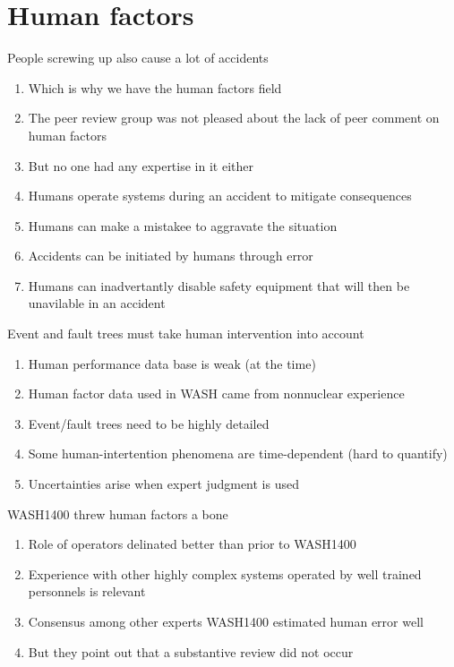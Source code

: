 \documentclass[aspectratio=1610,pdftex,dvipsnames,compress,xcolor={dvipsnames}]{beamer}
\begin{document}
\section{Human factors}


\addtocounter{framenumber}{-1}
\begin{frame}{People screwing up also cause a lot of accidents}
    \begin{enumerate}[series=outerlist,topsep=0pt,itemsep=7pt,leftmargin=*,label=(\arabic*)]
        \item[]Which is why we have the human factors field
        \item[]The peer review group was not pleased about the lack of peer comment on human factors
        \item[]But no one had any expertise in it either 
            \vspace{0.10in}
        \item Humans operate systems during an accident to mitigate consequences
        \item Humans can make a mistakee to aggravate the situation
        \item Accidents can be initiated by humans through error
        \item Humans can inadvertantly disable safety equipment that will then be unavilable in an accident
    \end{enumerate}
\end{frame}


\begin{frame}{Event and fault trees must take human intervention into account}
    \begin{enumerate}[series=outerlist,topsep=0pt,itemsep=21pt,leftmargin=*,label=(\arabic*)]
        \item Human performance data base is weak (at the time)
        \item Human factor data used in WASH came from nonnuclear experience
        \item Event/fault trees need to be highly detailed
        \item Some human-intertention phenomena are time-dependent (hard to quantify)
        \item Uncertainties arise when expert judgment is used 
    \end{enumerate}
\end{frame}


\begin{frame}{WASH1400 threw human factors a bone}
    \begin{enumerate}[series=outerlist,topsep=0pt,itemsep=21pt,leftmargin=*,label=(\arabic*)]
        \item Role of operators delinated better than prior to WASH1400
        \item Experience with other highly complex systems operated by well trained personnels is relevant
        \item Consensus among other experts WASH1400 estimated human error well
        \item[]But they point out that a substantive review did not occur
    \end{enumerate}
\end{frame}
\end{document}
